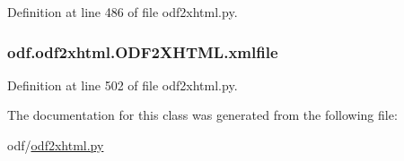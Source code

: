 Definition at line 486 of file odf2xhtml.\+py.

\hypertarget{classodf_1_1odf2xhtml_1_1ODF2XHTML_a7f4bf0df56081f422b31f78f6490d5af}{
\subsubsection[{xmlfile}]{\setlength{\rightskip}{0pt plus 5cm}odf.\+odf2xhtml.\+O\+D\+F2\+X\+H\+T\+M\+L.\+xmlfile}}\label{classodf_1_1odf2xhtml_1_1ODF2XHTML_a7f4bf0df56081f422b31f78f6490d5af}


Definition at line 502 of file odf2xhtml.\+py.



The documentation for this class was generated from the following file\+:\begin{DoxyCompactItemize}
\item 
odf/\hyperlink{odf2xhtml_8py}{odf2xhtml.\+py}\end{DoxyCompactItemize}
